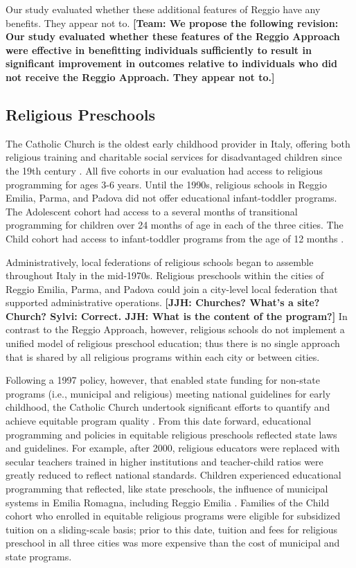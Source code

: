 Our study evaluated whether these additional features of Reggio have any benefits. They appear not to. \textbf{[Team: We propose the following revision: Our study evaluated whether these features of the Reggio Approach were effective in benefitting individuals sufficiently to result in significant improvement in outcomes relative to individuals who did not receive the Reggio Approach. They appear not to.]}

\subsection{Religious Preschools}

The Catholic Church is the oldest early childhood provider in Italy, offering both religious training and charitable social services for disadvantaged children since the 19th century \citep{OECD_2001_Italy-Country-Note}. All five cohorts in our evaluation had access to religious programming for ages 3-6 years. Until the 1990s, religious schools in Reggio Emilia, Parma, and Padova did not offer educational infant-toddler programs. The Adolescent cohort had access to a several months of transitional programming for children over 24 months of age in each of the three cities. The Child cohort had access to infant-toddler programs from the age of 12 months \citep{Malizia-Cicatelli_2011_BOOK_Catholic-School,CEHD_2016_Historical-Analysis}.

Administratively, local federations of religious schools began to assemble throughout Italy in the mid-1970s. Religious preschools within the cities of Reggio Emilia, Parma, and Padova could join a city-level local federation that supported administrative operations. \textbf{[JJH: Churches? What's a site? Church? Sylvi: Correct. JJH: What is the content of the program?]} In contrast to the Reggio Approach, however, religious schools do not implement a unified model of religious preschool education; thus there is no single approach that is shared by all religious programs within each city or between cities. 

Following a 1997 policy, however, that enabled state funding for non-state programs (i.e., municipal and religious) meeting national guidelines for early childhood, the Catholic Church undertook significant efforts to quantify and achieve equitable program quality \citep{Malizia-Cicatelli_2011_BOOK_Catholic-School}. From this date forward, educational programming and policies in equitable religious preschools reflected state laws and guidelines. For example, after 2000, religious educators were replaced with secular teachers trained in higher institutions and teacher-child ratios were greatly reduced to reflect national standards. Children experienced educational programming that reflected, like state preschools, the influence of municipal systems in Emilia Romagna, including Reggio Emilia \citep{Hohnerlein_2009_Paradox-Public-Preschools,OECD_2001_Italy-Country-Note}. Families of the Child cohort who enrolled in equitable religious programs were eligible for subsidized tuition on a sliding-scale basis; prior to this date, tuition and fees for religious preschool in all three cities was more expensive than the cost of municipal and state programs.

